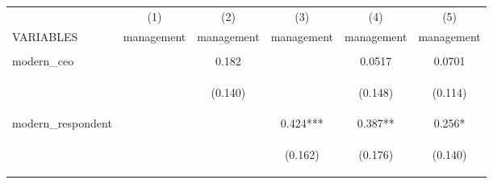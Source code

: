 \begin{center}
\begin{tabular}{lccccc} \hline
 & (1) & (2) & (3) & (4) & (5) \\
VARIABLES & management & management & management & management & management \\ \hline
\vspace{4pt} & \begin{footnotesize}\end{footnotesize} & \begin{footnotesize}\end{footnotesize} & \begin{footnotesize}\end{footnotesize} & \begin{footnotesize}\end{footnotesize} & \begin{footnotesize}\end{footnotesize} \\
modern\_ceo &  & 0.182 &  & 0.0517 & 0.0701 \\
\vspace{4pt} & \begin{footnotesize}\end{footnotesize} & \begin{footnotesize}(0.140)\end{footnotesize} & \begin{footnotesize}\end{footnotesize} & \begin{footnotesize}(0.148)\end{footnotesize} & \begin{footnotesize}(0.114)\end{footnotesize} \\
modern\_respondent &  &  & 0.424*** & 0.387** & 0.256* \\
\vspace{4pt} & \begin{footnotesize}\end{footnotesize} & \begin{footnotesize}\end{footnotesize} & \begin{footnotesize}(0.162)\end{footnotesize} & \begin{footnotesize}(0.176)\end{footnotesize} & \begin{footnotesize}(0.140)\end{footnotesize} \\

\end{tabular}
\end{center}
